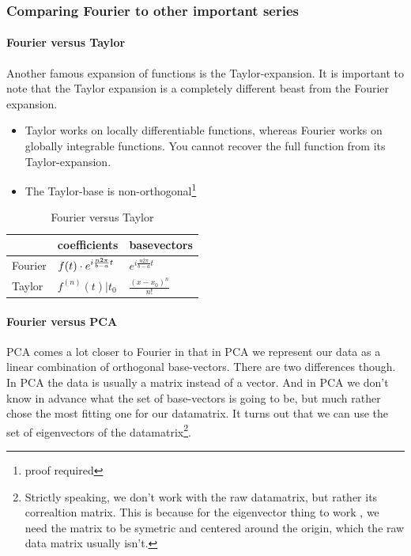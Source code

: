 \subsubsection{Comparing Fourier to other important series}

\paragraph{Fourier versus Taylor} Another famous expansion of functions is the Taylor-expansion. It is important to note that the Taylor expansion is a completely different beast from the Fourier expansion.

\begin{itemize}
    \item Taylor works on locally differentiable functions, whereas Fourier works on globally integrable functions. You cannot recover the full function from its Taylor-expansion.
    
    \item The Taylor-base is non-orthogonal\footnote{proof required}
\end{itemize}

\begin{table}[ht]
\centering
\caption{Fourier versus Taylor}
\begin{tabular}{@{}lll@{}}
\toprule
        & coefficients                                              & basevectors                       \\ \midrule
Fourier & $f(t) \cdot e^{i \frac{n 2 \pi}{b-a} t}$             & $e^{i \frac{n 2 \pi}{b-a}  t}$    \\
Taylor  & $f^{(n)}(t)|t_0$                                          & $\frac{(x- x_0)^n}{n!}$          
\end{tabular}
\end{table}

\paragraph{Fourier versus PCA} PCA comes a lot closer to Fourier in that in PCA we represent our data as a linear combination of orthogonal base-vectors. There are two differences though. In PCA the data is usually a matrix instead of a vector. And in PCA we don't know in advance what the set of base-vectors is going to be, but much rather chose the most fitting one for our datamatrix. It turns out that we can use the set of eigenvectors of the datamatrix\footnote{Strictly speaking, we don't work with the raw datamatrix, but rather its correaltion matrix. This is because for the eigenvector thing to work , we need the matrix to be symetric and centered around the origin, which the raw data matrix usually isn't.}.

